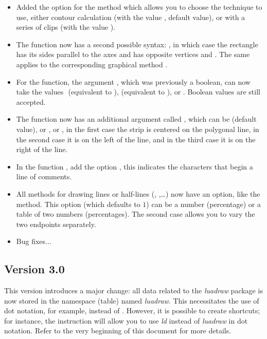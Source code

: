 \begin{itemize}
    \item Added the option  for the method  which allows you to choose the technique to use, either contour calculation (with the value \false, default value), or with a series of clips (with the value \true).

    \item The  function now has a second possible syntax: , in which case the rectangle has its sides parallel to the axes and has opposite vertices  and . ​​The same applies to the corresponding graphical method .
    
    \item For the  function, the argument , which was previously a boolean, can now take the values ​​ (equivalent to \false),  (equivalent to \true), or . Boolean values ​​are still accepted.
    
    \item The function  now has an additional argument called , which can be  (default value), or , or , in the first case the strip is centered on the polygonal line, in the second case it is on the left of the line, and in the third case it is on the right of the line.

    \item In the function , add the option , this indicates the characters that begin a line of comments.
    
    \item All methods for drawing lines or half-lines (, ,\ldots) now have an  option, like the  method. This option (which defaults to $1$) can be a number (percentage) or a table of two numbers (percentages). The second case allows you to vary the two endpoints separately.

    \item Bug fixes...
\end{itemize}

\subsection{Version 3.0}

This version introduces a major change: all data related to the \emph{luadraw} package is now stored in the namespace (table) named \emph{luadraw}. This necessitates the use of dot notation, for example,  instead of . However, it is possible to create shortcuts; for instance, the instruction  will allow you to use \emph{ld} instead of \emph{luadraw} in dot notation. Refer to the very beginning of this document for more details.

